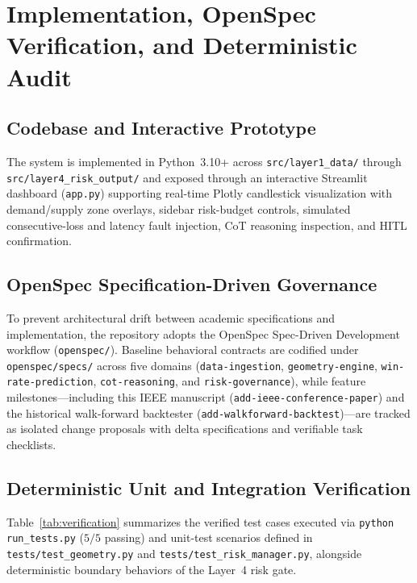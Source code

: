\documentclass[conference]{IEEEtran}
\begin{document}
\section{Implementation, OpenSpec Verification, and Deterministic Audit}
\subsection{Codebase and Interactive Prototype}
The system is implemented in Python~3.10+ across \texttt{src/layer1\_data/} through \texttt{src/layer4\_risk\_output/} and exposed through an interactive Streamlit dashboard (\texttt{app.py}) supporting real-time Plotly candlestick visualization with demand/supply zone overlays, sidebar risk-budget controls, simulated consecutive-loss and latency fault injection, CoT reasoning inspection, and HITL confirmation.

\subsection{OpenSpec Specification-Driven Governance}
To prevent architectural drift between academic specifications and implementation, the repository adopts the OpenSpec Spec-Driven Development workflow (\texttt{openspec/}). Baseline behavioral contracts are codified under \texttt{openspec/specs/} across five domains (\texttt{data-ingestion}, \texttt{geometry-engine}, \texttt{win-rate-prediction}, \texttt{cot-reasoning}, and \texttt{risk-governance}), while feature milestones—including this IEEE manuscript (\texttt{add-ieee-conference-paper}) and the historical walk-forward backtester (\texttt{add-walkforward-backtest})—are tracked as isolated change proposals with delta specifications and verifiable task checklists.

\subsection{Deterministic Unit and Integration Verification}
Table~\ref{tab:verification} summarizes the verified test cases executed via \texttt{python run\_tests.py} ($5/5$ passing) and unit-test scenarios defined in \texttt{tests/test\_geometry.py} and \texttt{tests/test\_risk\_manager.py}, alongside deterministic boundary behaviors of the Layer~4 risk gate.
\end{document}
